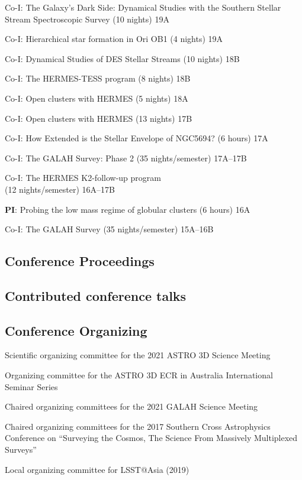 \documentclass[10pt]{article}
\newcommand{\cvlist}{}
\begin{document}
\begin{innerlist}
\begin{innerlist}
\item Co-I: The Galaxy's Dark Side: Dynamical Studies with the Southern Stellar Stream Spectroscopic Survey (10 nights) \hfill{19A}
\item Co-I: Hierarchical star formation in Ori OB1 (4 nights) \hfill{19A}
\item Co-I: Dynamical Studies of DES Stellar Streams (10 nights) \hfill{18B}
\item Co-I: The HERMES-TESS program (8 nights) \hfill{18B}
\item Co-I: Open clusters with HERMES (5 nights) \hfill{18A}
\item Co-I: Open clusters with HERMES (13 nights) \hfill{17B}
\item Co-I: How Extended is the Stellar Envelope of NGC5694? (6 hours) \hfill{17A}
\item Co-I: The GALAH Survey: Phase 2 (35 nights/semester) \hfill{17A--17B}
\item Co-I: The HERMES K2-follow-up program \\ (12 nights/semester)  \hfill{16A--17B}
\item \textbf{PI}: Probing the low mass regime of globular clusters (6 hours) \hfill{16A}
\item Co-I: The GALAH Survey (35 nights/semester) \hfill{15A--16B}
\end{innerlist}

\end{innerlist}

\subsection*{Conference Proceedings}
\begin{list}{}{\cvlist}

\end{list}

\subsection*{Contributed conference talks}
\begin{list}{}{\cvlist}

\end{list}

\subsection*{Conference Organizing}
\begin{innerlist}
  \item Scientific organizing committee for the 2021 ASTRO 3D Science Meeting
  \item Organizing committee for the ASTRO 3D ECR in Australia International Seminar Series
  \item Chaired organizing committees for the 2021 GALAH Science Meeting
  \item Chaired organizing committees for the 2017 Southern Cross Astrophysics Conference on ``Surveying the Cosmos, The Science From Massively Multiplexed Surveys''
	\item Local organizing committee for LSST@Asia (2019)
\end{innerlist}
\end{document}
